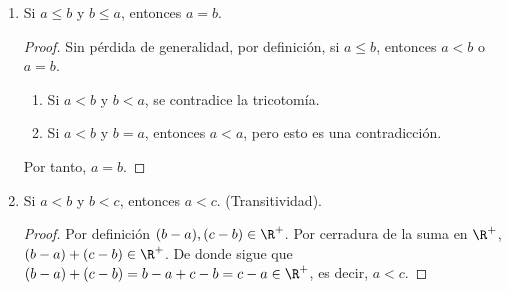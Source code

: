 \begin{enumerate}[label=\alph*)]
% 
% 

 \item Si $a\leq b$ y $b\leq a$, entonces $a=b$.
 \begin{proof}\leavevmode
  Sin pérdida de generalidad, por definición, si $a\leq b$, entonces $a<b$ o $a=b$.
  \begin{enumerate}[label=\roman*)]
    \item Si $a<b$ y $b<a$, se contradice la tricotomía. 
    \item Si $a<b$ y $b=a$, entonces $a<a$, pero esto es una contradicción.
  \end{enumerate}
  Por tanto, $a=b$.
 \end{proof}

 \item Si $a<b$ y $b<c$, entonces $a<c$. (Transitividad).
 \begin{proof} 
  Por definición $(b-a) , (c-b) \in \R^+$. Por cerradura de la suma en $\R^+$, $(b-a) + (c-b) \in \R^+$. De donde sigue que $(b-a)+(c-b)=b-a+c-b=c-a\in \R^+$, es decir, $a<c$.
 \end{proof}


\end{enumerate}

